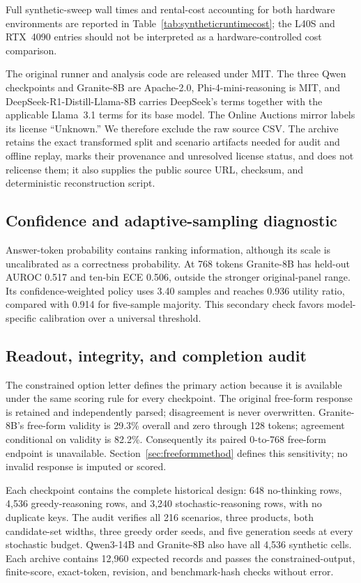 \documentclass{article}
\begin{document}
Full synthetic-sweep wall times and rental-cost accounting for both hardware environments are reported in Table~\ref{tab:syntheticruntimecost}; the L40S and RTX~4090 entries should not be interpreted as a hardware-controlled cost comparison.

The original runner and analysis code are released under MIT. The three Qwen checkpoints and Granite-8B are Apache-2.0, Phi-4-mini-reasoning is MIT, and DeepSeek-R1-Distill-Llama-8B carries DeepSeek's terms together with the applicable Llama~3.1 terms for its base model. The Online Auctions mirror labels its license ``Unknown.'' We therefore exclude the raw source CSV. The archive retains the exact transformed split and scenario artifacts needed for audit and offline replay, marks their provenance and unresolved license status, and does not relicense them; it also supplies the public source URL, checksum, and deterministic reconstruction script.

\subsection{Confidence and adaptive-sampling diagnostic}

Answer-token probability contains ranking information, although its scale is uncalibrated as a correctness probability. At 768 tokens Granite-8B has held-out AUROC 0.517 and ten-bin ECE 0.506, outside the stronger original-panel range. Its confidence-weighted policy uses 3.40 samples and reaches 0.936 utility ratio, compared with 0.914 for five-sample majority. This secondary check favors model-specific calibration over a universal threshold.

\subsection{Readout, integrity, and completion audit}
The constrained option letter defines the primary action because it is available under the same scoring rule for every checkpoint. The original free-form response is retained and independently parsed; disagreement is never overwritten. Granite-8B's free-form validity is 29.3\% overall and zero through 128 tokens; agreement conditional on validity is 82.2\%. Consequently its paired 0-to-768 free-form endpoint is unavailable. Section~\ref{sec:freeformmethod} defines this sensitivity; no invalid response is imputed or scored.

Each checkpoint contains the complete historical design: 648 no-thinking rows, 4,536 greedy-reasoning rows, and 3,240 stochastic-reasoning rows, with no duplicate keys. The audit verifies all 216 scenarios, three products, both candidate-set widths, three greedy order seeds, and five generation seeds at every stochastic budget. Qwen3-14B and Granite-8B also have all 4,536 synthetic cells. Each archive contains 12,960 expected records and passes the constrained-output, finite-score, exact-token, revision, and benchmark-hash checks without error.
\end{document}
